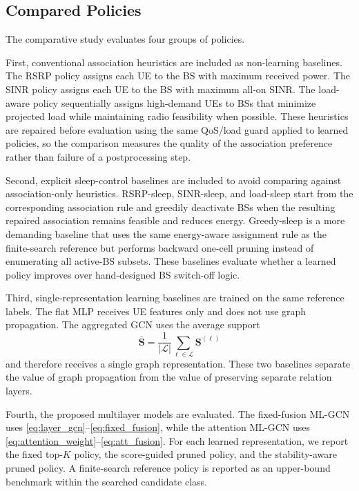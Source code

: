 \documentclass[journal]{IEEEtran}
\begin{document}
\subsection{Compared Policies}
The comparative study evaluates four groups of policies.

First, conventional association heuristics are included as non-learning
baselines. The RSRP policy assigns each UE to the BS with maximum received
power. The SINR policy assigns each UE to the BS with maximum all-on SINR. The
load-aware policy sequentially assigns high-demand UEs to BSs that minimize
projected load while maintaining radio feasibility when possible. These
heuristics are repaired before evaluation using the same QoS/load guard applied
to learned policies, so the comparison measures the quality of the association
preference rather than failure of a postprocessing step.

Second, explicit sleep-control baselines are included to avoid comparing
against association-only heuristics. RSRP-sleep, SINR-sleep, and load-sleep
start from the corresponding association rule and greedily deactivate BSs when
the resulting repaired association remains feasible and reduces energy.
Greedy-sleep is a more demanding baseline that uses the same energy-aware assignment
rule as the finite-search reference but performs backward one-cell pruning
instead of enumerating all active-BS subsets. These baselines evaluate whether
a learned policy improves over hand-designed BS switch-off logic.

Third, single-representation learning baselines are trained on the same
reference labels. The flat MLP receives UE features only and does not use graph
propagation. The aggregated GCN uses the average support
\begin{equation}
    \bar{\mathbf{S}}=\frac{1}{|\mathcal{L}|}
    \sum_{\ell\in\mathcal{L}}\mathbf{S}^{(\ell)}
\end{equation}
and therefore receives a single graph representation. These two baselines
separate the value of graph propagation from the value of preserving separate
relation layers.

Fourth, the proposed multilayer models are evaluated. The fixed-fusion ML-GCN
uses \eqref{eq:layer_gcn}--\eqref{eq:fixed_fusion}, while the attention ML-GCN
uses \eqref{eq:attention_weight}--\eqref{eq:att_fusion}. For each learned
representation, we report the fixed top-$K$ policy, the score-guided pruned
policy, and the stability-aware pruned policy. A finite-search reference policy
is reported as an upper-bound benchmark within the searched candidate class.
\end{document}
